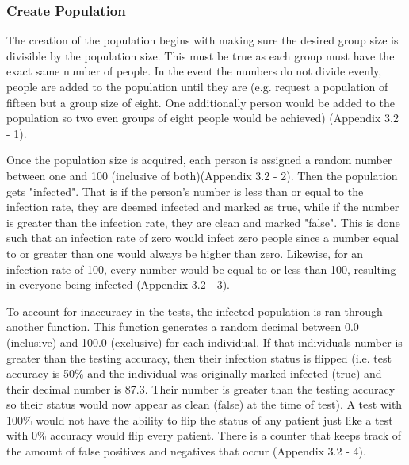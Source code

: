 \documentclass[letterpaper, 10pt,DIV=13]{scrartcl}
\numberwithin{equation}{section} %
\numberwithin{figure}{section} %
\numberwithin{table}{section} %
\begin{document}
\subsubsection{Create Population}

The creation of the population begins with making sure the desired group size is divisible by the population size.  This must be true as each group must have the exact same number of people.  In the event the numbers do not divide evenly, people are added to the population until they are (e.g. request a population of fifteen but a group size of eight.  One additionally person would be added to the population so two even groups of eight people would be achieved) (Appendix 3.2 - 1).  

Once the population size is acquired, each person is assigned a random number between one and 100 (inclusive of both)(Appendix 3.2 - 2).  Then the population gets "infected".  That is if the person's number is less than or equal to the infection rate, they are deemed infected and marked as true, while if the number is greater than the infection rate, they are clean and marked "false".  This is done such that an infection rate of zero would infect zero people since a number equal to or greater than one would always be higher than zero.  Likewise, for an infection rate of 100, every number would be equal to or less than 100, resulting in everyone being infected (Appendix 3.2 - 3).  

To account for inaccuracy in the tests, the infected population is ran through another function.  This function generates a random decimal between 0.0 (inclusive) and 100.0 (exclusive) for each individual.  If that individuals number is greater than the testing accuracy, then their infection status is flipped (i.e. test accuracy is 50\% and the individual was originally marked infected (true) and their decimal number is 87.3.  Their number is greater than the testing accuracy so their status would now appear as clean (false) at the time of test).  A test with 100\% would not have the ability to flip the status of any patient just like a test with 0\% accuracy would flip every patient.  There is a counter that keeps track of the amount of false positives and negatives that occur (Appendix 3.2 - 4). 
\end{document}
